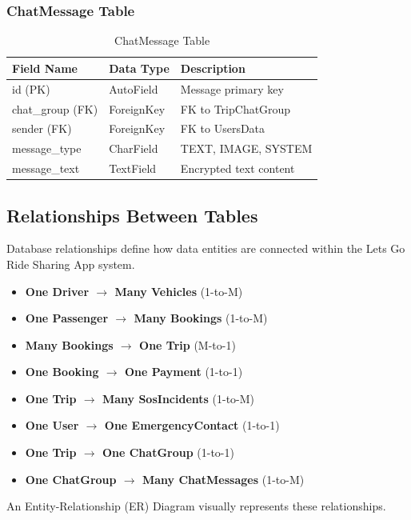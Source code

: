 \subsubsection{ChatMessage Table}
\begin{table}[H]
\centering
\caption{ChatMessage Table}
\renewcommand{\arraystretch}{1.5}
\begin{tabular}{|p{3cm}|p{3.5cm}|p{7cm}|}
\hline
\textbf{Field Name} & \textbf{Data Type} & \textbf{Description} \\
\hline
id (PK) & AutoField & Message primary key \\
\hline
chat\_group (FK) & ForeignKey & FK to TripChatGroup \\
\hline
sender (FK) & ForeignKey & FK to UsersData \\
\hline
message\_type & CharField & TEXT, IMAGE, SYSTEM \\
\hline
message\_text & TextField & Encrypted text content \\
\hline
\end{tabular}
\end{table}

\subsection{Relationships Between Tables}

Database relationships define how data entities are connected within the Lets Go Ride Sharing App system.

\begin{itemize}
    \item \textbf{One Driver $\rightarrow$ Many Vehicles} (1-to-M)
    \item \textbf{One Passenger $\rightarrow$ Many Bookings} (1-to-M)
    \item \textbf{Many Bookings $\rightarrow$ One Trip} (M-to-1)
    \item \textbf{One Booking $\rightarrow$ One Payment} (1-to-1)
    \item \textbf{One Trip $\rightarrow$ Many SosIncidents} (1-to-M)
    \item \textbf{One User $\rightarrow$ One EmergencyContact} (1-to-1)
    \item \textbf{One Trip $\rightarrow$ One ChatGroup} (1-to-1)
    \item \textbf{One ChatGroup $\rightarrow$ Many ChatMessages} (1-to-M)
\end{itemize}

An Entity-Relationship (ER) Diagram visually represents these relationships.

